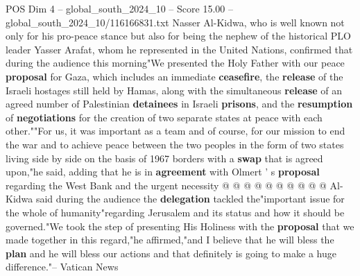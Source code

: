 \begin{textsample}{POS Dim 4 – global\_south\_2024\_10 – Score 15.00 – global\_south\_2024\_10/116166831.txt}
Nasser Al-Kidwa, who is well known not only for his pro-peace stance but also for being the nephew of the historical PLO leader Yasser Arafat, whom he represented in the United Nations, confirmed that during the audience this morning"We presented the Holy Father with our peace \textbf{proposal} for Gaza, which includes an immediate \textbf{ceasefire}, the \textbf{release} of the Israeli hostages still held by Hamas, along with the simultaneous \textbf{release} of an agreed number of Palestinian \textbf{detainees} in Israeli \textbf{prisons}, and the \textbf{resumption} of \textbf{negotiations} for the creation of two separate states at peace with each other.""For us, it was important as a team and of course, for our mission to end the war and to achieve peace between the two peoples in the form of two states living side by side on the basis of 1967 borders with a \textbf{swap} that is agreed upon,"he said, adding that he is in \textbf{agreement} with Olmert ' s \textbf{proposal} regarding the West Bank and the urgent necessity @ @ @ @ @ @ @ @ @ @ Al-Kidwa said during the audience the \textbf{delegation} tackled the"important issue for the whole of humanity"regarding Jerusalem and its status and how it should be governed."We took the step of presenting His Holiness with the \textbf{proposal} that we made together in this regard,"he affirmed,"and I believe that he will bless the \textbf{plan} and he will bless our actions and that definitely is going to make a huge difference."-- Vatican News

\end{textsample}
